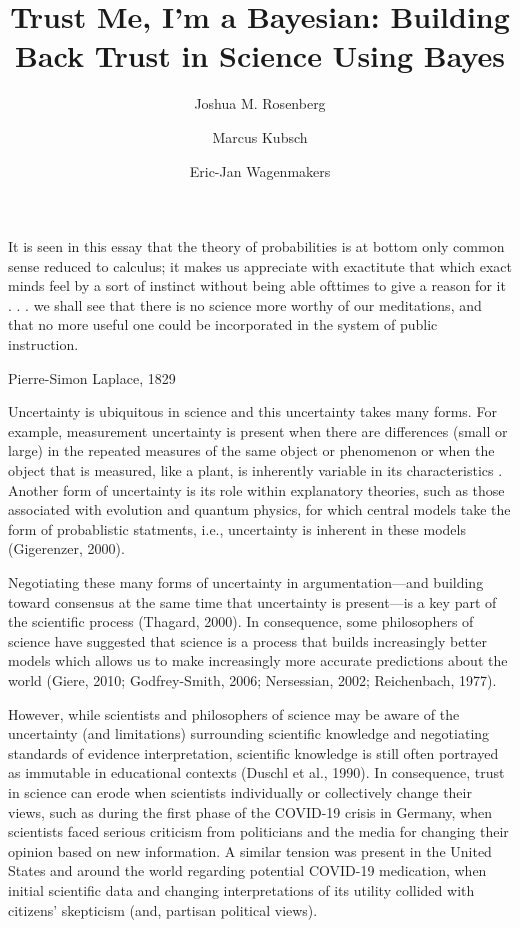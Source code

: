 \documentclass[man]{apa7}
\title{Trust Me, I'm a Bayesian: Building Back Trust in Science Using Bayes}
\author{Joshua M. Rosenberg}
\affiliation{University of Tennessee, Knoxville}
\author{Marcus Kubsch}
\affiliation{IPN - Leibniz Institute for Science and Mathematics Education}
\author{Eric-Jan Wagenmakers}
\affiliation{University of Amsterdam}
\newcommand{\EJ}[1]{\todo[inline, color=green]{  #1 }}
\begin{document}
\maketitle

\setlength{\epigraphwidth}{1.0\textwidth} %
\epigraph{It is seen in this essay that the theory of probabilities is at bottom only common sense reduced to calculus; it makes us appreciate with exactitute that which exact minds feel by a sort of instinct without being able ofttimes to give a reason for it . . . we shall see that there is no science more worthy of our meditations, and that no more useful one could be incorporated in the system of public instruction.}{Pierre-Simon Laplace, 1829}
\setlength{\epigraphwidth}{0.4\textwidth} %

\EJ{This is a comment.}

Uncertainty is ubiquitous in science and this uncertainty takes many forms. For example, measurement uncertainty is present when there are differences (small or large) in the repeated measures of the same object or phenomenon \parencite{pls03} or when the object that is measured, like a plant, is inherently variable in its characteristics \parencite{pls03}. Another form of uncertainty is its role within explanatory theories, such as those associated with evolution and quantum physics, for which central models take the form of probablistic statments, i.e., uncertainty is inherent in these models (Gigerenzer, 2000).

Negotiating these many forms of uncertainty in argumentation—and building toward consensus at the same time that uncertainty is present—is a key part of the scientific process (Thagard, 2000). In consequence, some philosophers of science have suggested that science is a process that builds increasingly better models which allows us to make increasingly more accurate predictions about the world (Giere, 2010; Godfrey-Smith, 2006; Nersessian, 2002; Reichenbach, 1977). 

However, while scientists and philosophers of science may be aware of the uncertainty (and limitations) surrounding scientific knowledge and negotiating standards of evidence interpretation, scientific knowledge is still often portrayed as immutable in educational contexts (Duschl et al., 1990). In consequence, trust in science can erode when scientists individually or collectively change their views, such as during the first phase of the COVID-19 crisis in Germany, when scientists faced serious criticism from politicians and the media for changing their opinion based on new information. A similar tension was present in the United States and around the world regarding potential COVID-19 medication, when initial scientific data and changing interpretations of its utility collided with citizens’ skepticism (and, partisan political views).
\end{document}
